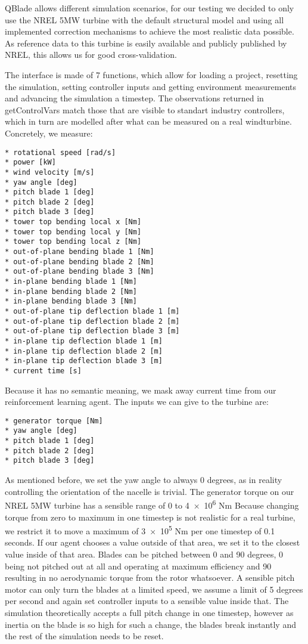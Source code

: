 \documentclass[hyperref,german,beleg]{cgvpub}
\begin{document}
QBlade allows different simulation scenarios, for our testing we decided to only use the NREL 5MW \cite{jonkmanDefinition5MWReference2009} turbine with the default structural model and using all implemented correction mechanisms to achieve the most realistic data possible. As reference data to this turbine is easily available and publicly published by NREL, this allows us for good cross-validation.

The interface is made of 7 functions, which allow for loading a project, resetting the simulation, setting controller inputs and getting environment measurements and advancing the simulation a timestep. The observations returned in getControlVars match those that are visible to standart industry controllers, which in turn are modelled after what can be measured on a real windturbine. Concretely, we measure:
\begin{verbatim}
* rotational speed [rad/s]
* power [kW]
* wind velocity [m/s]
* yaw angle [deg]
* pitch blade 1 [deg]
* pitch blade 2 [deg]
* pitch blade 3 [deg]
* tower top bending local x [Nm]
* tower top bending local y [Nm]
* tower top bending local z [Nm]
* out-of-plane bending blade 1 [Nm]
* out-of-plane bending blade 2 [Nm]
* out-of-plane bending blade 3 [Nm]
* in-plane bending blade 1 [Nm]
* in-plane bending blade 2 [Nm]
* in-plane bending blade 3 [Nm]
* out-of-plane tip deflection blade 1 [m]
* out-of-plane tip deflection blade 2 [m]
* out-of-plane tip deflection blade 3 [m]
* in-plane tip deflection blade 1 [m]
* in-plane tip deflection blade 2 [m]
* in-plane tip deflection blade 3 [m]
* current time [s]
\end{verbatim}

Because it has no semantic meaning, we mask away current time from our reinforcement learning agent. The inputs we can give to the turbine are:
\begin{verbatim}
* generator torque [Nm]
* yaw angle [deg]
* pitch blade 1 [deg]
* pitch blade 2 [deg]
* pitch blade 3 [deg]
\end{verbatim}

As mentioned before, we set the yaw angle to always 0 degrees, as in reality controlling the orientation of the nacelle is trivial. The generator torque on our NREL 5MW turbine has a sensible range of \num{0} to \num{4e6} Nm%
Because changing torque from zero to maximum in one timestep is not realistic for a real turbine, we restrict it to move a maximum of \num{3e5} Nm per one timestep of 0.1 seconds. If our agent chooses a value outside of that area, we set it to the closest value inside of that area.
Blades can be pitched between 0 and 90 degrees, 0 being not pitched out at all and operating at maximum efficiency and 90 resulting in no aerodynamic torque from the rotor whatsoever. A sensible pitch motor can only turn the blades at a limited speed, we assume a limit of 5 degrees per second and again set controller inputs to a sensible value inside that. The simulation theoretically accepts a full pitch change in one timestep, however as inertia on the blade is so high for such a change, the blades break instantly and the rest of the simulation needs to be reset.
\end{document}
